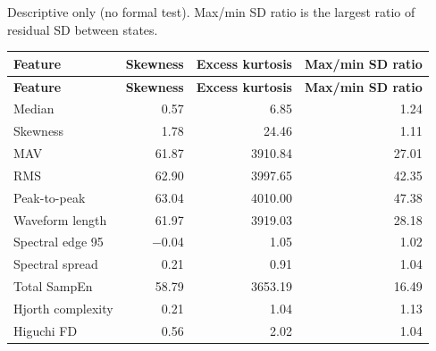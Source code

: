\documentclass[10pt]{article}
\begin{document}
Descriptive only (no formal test). Max/min SD ratio is the largest ratio of residual SD between states.
\begin{longtable}{p{4.2cm}rrr}
\toprule
\textbf{Feature} & \textbf{Skewness} & \textbf{Excess kurtosis} & \textbf{Max/min SD ratio} \\
\midrule
\endfirsthead
\toprule
\textbf{Feature} & \textbf{Skewness} & \textbf{Excess kurtosis} & \textbf{Max/min SD ratio} \\
\midrule
\endhead
Median & 0.57 & 6.85 & 1.24 \\
Skewness & 1.78 & 24.46 & 1.11 \\
MAV & 61.87 & 3910.84 & 27.01 \\
RMS & 62.90 & 3997.65 & 42.35 \\
Peak-to-peak & 63.04 & 4010.00 & 47.38 \\
Waveform length & 61.97 & 3919.03 & 28.18 \\
Spectral edge 95 & $-$0.04 & 1.05 & 1.02 \\
Spectral spread & 0.21 & 0.91 & 1.04 \\
Total SampEn & 58.79 & 3653.19 & 16.49 \\
Hjorth complexity & 0.21 & 1.04 & 1.13 \\
Higuchi FD & 0.56 & 2.02 & 1.04 \\
\bottomrule
\end{longtable}
\end{document}
